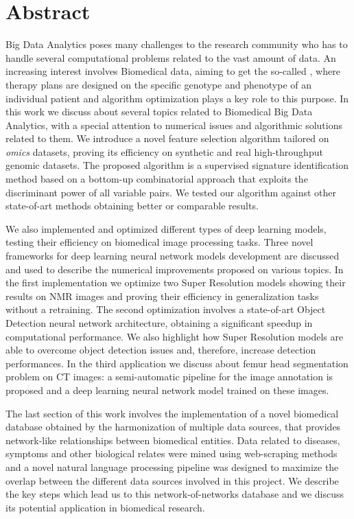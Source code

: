 \documentclass{standalone}
\begin{document}
\chapter*{Abstract}

Big Data Analytics poses many challenges to the research community who has to handle several computational problems related to the vast amount of data.
An increasing interest involves Biomedical data, aiming to get the so-called , where therapy plans are designed on the specific genotype and phenotype of an individual patient and algorithm optimization plays a key role to this purpose.
In this work we discuss about several topics related to Biomedical Big Data Analytics, with a special attention to numerical issues and algorithmic solutions related to them.
We introduce a novel feature selection algorithm tailored on \emph{omics} datasets, proving its efficiency on synthetic and real high-throughput genomic datasets.
The proposed algorithm is a supervised signature identification method based on a bottom-up combinatorial approach that exploits the discriminant power of all variable pairs.
We tested our algorithm against other state-of-art methods obtaining better or comparable results.

We also implemented and optimized different types of deep learning models, testing their efficiency on biomedical image processing tasks.
Three novel frameworks for deep learning neural network models development are discussed and used to describe the numerical improvements proposed on various topics.
In the first implementation we optimize two Super Resolution models showing their results on NMR images and proving their efficiency in generalization tasks without a retraining.
The second optimization involves a state-of-art Object Detection neural network architecture, obtaining a significant speedup in computational performance.
We also highlight how Super Resolution models are able to overcome object detection issues and, therefore, increase detection performances.
In the third application we discuss about femur head segmentation problem on CT images: a semi-automatic pipeline for the image annotation is proposed and a deep learning neural network model trained on these images.

The last section of this work involves the implementation of a novel biomedical database obtained by the harmonization of multiple data sources, that provides network-like relationships between biomedical entities.
Data related to diseases, symptoms and other biological relates were mined using web-scraping methods and a novel natural language processing pipeline was designed to maximize the overlap between the different data sources involved in this project.
We describe the key steps which lead us to this network-of-networks database and we discuss its potential application in biomedical research.
\end{document}
